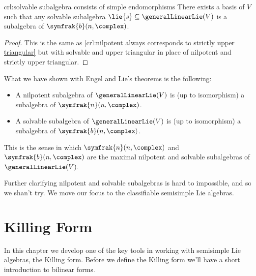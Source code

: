 \documentclass[fleqn]{NotesClass}
\newcommand{\borelLie}{\symfrak{b}}
\newcommand{\nilpotentLie}{\symfrak{n}}
\begin{document}
    \begin{crl}{}{crl:solvable subalgebra consists of simple endomorphisms}
        There exists a basis of \(V\) such that any solvable subalgebra \(\lie{s} \subseteq \generalLinearLie(V)\) is a subalgebra of \(\borelLie(n, \complex)\).
        \begin{proof}
            This is the same as \cref{crl:nilpotent always corresponds to strictly upper triangular} but with solvable and upper triangular in place of nilpotent and strictly upper triangular.
        \end{proof}
    \end{crl}
    
    What we have shown with Engel and Lie's theorems is the following:
    \begin{itemize}
        \item A nilpotent subalgebra of \(\generalLinearLie(V)\) is (up to isomorphism) a subalgebra of \(\nilpotentLie(n, \complex)\).
        \item A solvable subalgebra of \(\generalLinearLie(V)\) is (up to isomorphism) a subalgebra of \(\borelLie(n, \complex)\).
    \end{itemize}
    This is the sense in which \(\nilpotentLie(n, \complex)\) and \(\borelLie(n, \complex)\) are the maximal nilpotent and solvable subalgebras of \(\generalLinearLie(V)\).
    
    Further clarifying nilpotent and solvable subalgebras is hard to impossible, and so we shan't try.
    We move our focus to the classifiable semisimple Lie algebras.
    
    \chapter{Killing Form}
    In this chapter we develop one of the key tools in working with semisimple Lie algebras, the Killing form.
    Before we define the Killing form we'll have a short introduction to bilinear forms.
    
\end{document}
